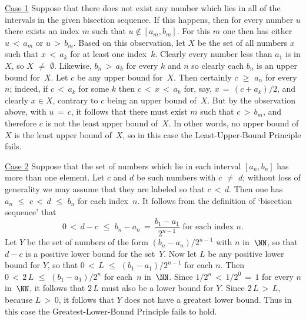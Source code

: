         \h \underline{Case 1} Suppose that there does not exist any number which lies in all of the intervals in the given bisection sequence.
    If this happens, then for every number $u$ there exists an index $m$ such that $u \not \in [a_{m},b_{m}]$.
    For this $m$ one then has either $u\,<\,a_{m}$ or $u\,>\,b_{m}$. Based on this observation,
    let $X$ be the set of all numbers $x$ such that $x\,<\,a_{k}$ for at least one index~$k$.
    Clearly every number less than $a_{1}$ is in $X$, so $X \,\,{\neq}\,\, {\emptyset}$.
    Likewise, $b_{n}\,>\,a_{k}$ for every $k$ and $n$ so clearly each $b_{n}$ is an upper bound for~$X$.
    Let $c$ be any upper bound for~$X$. Then certainly $c\,\,{\geq}\,\,a_{n}$ for every~$n$;
    indeed, if $c\,<\,a_{k}$ for some $k$ then $c\,<\,x\,<\,a_{k}$ for, say, $x \,=\, (c+a_{k})/2$,
    and clearly $x{\in}X$, contrary to $c$ being an upper bound of~$X$. But by the observation above, with $u \,=\, c$,
    it follows that there must exist $m$ such that $c\,>\,b_{m}$, and therefore $c$ is not the least upper bound of~$X$.
    In other words, no upper bound of $X$ is the least upper bound of~$X$, so in this case the Least-Upper-Bound Principle fails.

\VA

        \h \underline{Case 2} Suppose that the set of numbers which lie in each interval $[a_{n},b_{n}]$ has more than one element.
    Let $c$ and $d$ be such numbers with $c \,\,{\neq}\,\, d$; without loss of generality we may assume that they are labeled so that $c\,<\,d$.
    Then one has $a_{n}\,\,{\leq}\,\,c\,<\,d\,\,{\leq}\,\,b_{n}$ for each index~$n$. It follows from the definition of `bisection sequence' that
        \begin{displaymath}
        0\,<\,d-c\,\,{\leq}\,\,b_{n}-a_{n} \,=\, \frac{b_{1}-a_{1}}{2^{n-1}} \mbox{ for each index $n$}.
        \end{displaymath}
    Let $Y$ be the set of numbers of the form $(b_{n}-a_{n})/2^{n-1}$ with $n$ in~${\NN}$, so that $d-c$ is a positive lower bound for the set~$Y$.
      Now let $L$ be any positive lower bound for $Y$,
    so that $0\,<\,L\,\,{\leq}\,\,(b_{1}-a_{1})/2^{n-1}$ for each $n$. Then $0\,<\,2\,L\,\,{\leq}\,\,(b_{1}-a_{1})/2^{n}$ for each~$n$ in~${\NN}$.
    Since $1/2^{n}\,<\,1/2^{0} \,=\, 1$ for every $n$ in~${\NN}$, it follows that $2\,L$ must also be a lower bound for $Y$.
    Since $2\,L\,>\,L$, because $L\,>\,0$, it follows that $Y$ does not have a greatest lower bound.
    Thus in this case the Greatest-Lower-Bound Principle fails to hold.


